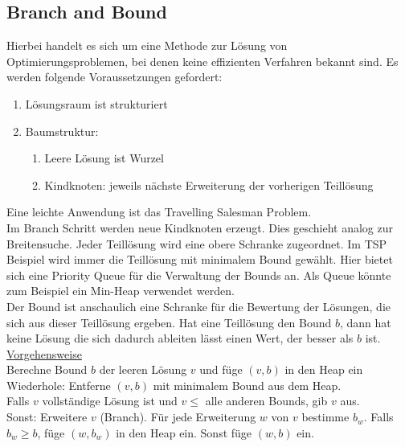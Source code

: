 \documentclass[a4paper, 12pt]{article}
\begin{document}
	\subsection{Branch and Bound}
	Hierbei handelt es sich um eine Methode zur Lösung von Optimierungsproblemen, bei denen keine effizienten Verfahren bekannt sind. Es werden folgende Voraussetzungen gefordert: \begin{enumerate}
		\item Lösungsraum ist strukturiert
		\item Baumstruktur: \begin{enumerate}
			\item Leere Lösung ist Wurzel
			\item Kindknoten: jeweils nächste Erweiterung der vorherigen Teillösung
		\end{enumerate}
	\end{enumerate}
	Eine leichte Anwendung ist das Travelling Salesman Problem.\\
	
	Im Branch Schritt werden neue Kindknoten erzeugt. Dies geschieht analog zur Breitensuche. Jeder Teillösung wird eine obere Schranke zugeordnet. Im TSP Beispiel wird immer die Teillösung mit minimalem Bound gewählt. Hier bietet sich eine Priority Queue für die Verwaltung der Bounds an. Als Queue könnte zum Beispiel ein Min-Heap verwendet werden.\\
	
	Der Bound ist anschaulich eine Schranke für die Bewertung der Lösungen, die sich aus dieser Teillösung ergeben. Hat eine Teillösung den Bound $b$, dann hat keine Lösung die sich dadurch ableiten lässt einen Wert, der besser als $b$ ist.\\
	\underline{Vorgehensweise}\\
	Berechne Bound $b$ der leeren Lösung $v$ und füge $(v,b)$ in den Heap ein\\
	Wiederhole: Entferne $(v,b)$ mit minimalem Bound aus dem Heap.\\
	Falls $v$ vollständige Lösung ist und $v \leq$ alle anderen Bounds, gib $v$ aus.\\
	Sonst: Erweitere $v$ (Branch). Für jede Erweiterung $w$ von $v$ bestimme $b_w$. Falls $b_w \geq b$, füge $(w,b_w)$ in den Heap ein. Sonst füge $(w,b)$ ein.
\end{document}
